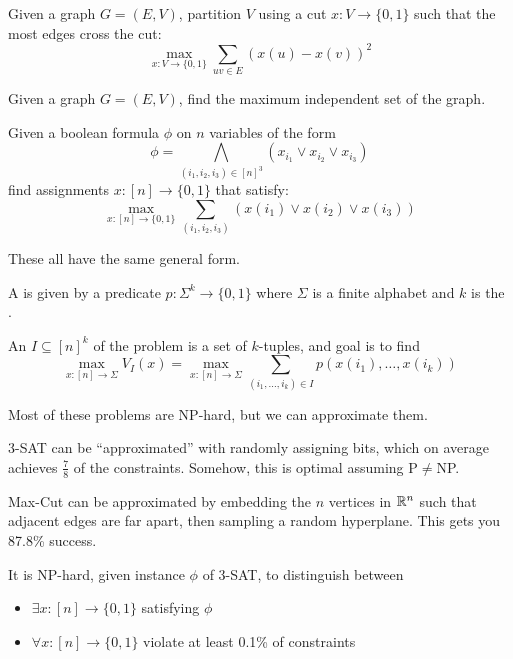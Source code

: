\documentclass[class=co432,notes,tikz]{agony}
\begin{document}
\begin{example}
  Given a graph $G = (E, V)$, partition $V$ using a cut $x : V \to \{0,1\}$
  such that the most edges cross the cut:
  \[ \max_{x:V\to\{0,1\}} \sum_{uv\in E}(x(u)-x(v))^2 \]
\end{example}

\begin{example}[max-IS]
  Given a graph $G = (E, V)$, find the maximum independent set of the graph.
\end{example}

\begin{example}[3-SAT]
  Given a boolean formula $\phi$ on $n$ variables of the form
  \[ \phi = \bigwedge_{(i_1,i_2,i_3) \in [n]^3}(x_{i_1} \lor x_{i_2} \lor x_{i_3}) \]
  find assignments $x : [n] \to \{0,1\}$ that satisfy:
  \[ \max_{x : [n] \to \{0,1\}} \sum_{(i_1,i_2,i_3)} (x(i_1) \lor x(i_2) \lor x(i_3)) \]
\end{example}

These all have the same general form.

\begin{defn}
  A  is given by a predicate
  $p : \Sigma^k \to \{0,1\}$ where $\Sigma$ is a finite alphabet and $k$ is the
  .

  An  $I \subseteq [n]^k$ of the problem is a set of $k$-tuples,
  and goal is to find
  \[ \max_{x : [n] \to \Sigma} V_I(x) = \max_{x : [n] \to \Sigma} \sum_{(i_1,\dotsc,i_k)\in I} p(x({i_1}),\dotsc,x({i_k})) \]
\end{defn}

Most of these problems are NP-hard, but we can approximate them.

3-SAT can be ``approximated'' with randomly assigning bits,
which on average achieves $\frac78$ of the constraints.
Somehow, this is optimal assuming P$\neq$NP.

Max-Cut can be approximated by embedding the $n$ vertices
in $\mathbb{R}^n$ such that adjacent edges are far apart,
then sampling a random hyperplane.
This gets you 87.8\% success.

\begin{theorem}
  It is NP-hard, given instance $\phi$ of 3-SAT, to distinguish between
  \begin{itemize}[nosep]
    \item $\exists x : [n] \to \{0,1\}$ satisfying $\phi$
    \item $\forall x : [n] \to \{0,1\}$ violate at least 0.1\% of constraints
  \end{itemize}
\end{theorem}
\end{document}
